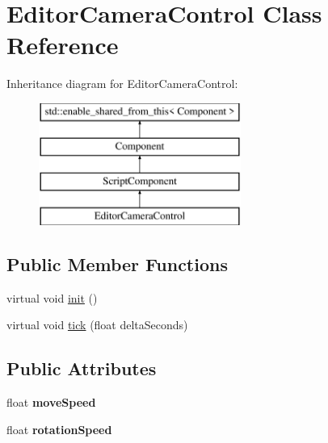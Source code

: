 \hypertarget{class_editor_camera_control}{}\section{Editor\+Camera\+Control Class Reference}
\label{class_editor_camera_control}
Inheritance diagram for Editor\+Camera\+Control\+:\begin{figure}[H]
\begin{center}
\leavevmode
\includegraphics[height=4.000000cm]{class_editor_camera_control}
\end{center}
\end{figure}
\subsection*{Public Member Functions}
\begin{DoxyCompactItemize}
\item 
virtual void \hyperlink{class_editor_camera_control_af672d52ea342e6762f9f104898959181}{init} ()
\item 
virtual void \hyperlink{class_editor_camera_control_a829966c94f5f99911a20534692dcc78f}{tick} (float delta\+Seconds)
\end{DoxyCompactItemize}
\subsection*{Public Attributes}
\begin{DoxyCompactItemize}
\item 
\hypertarget{class_editor_camera_control_a5297aa27db37eabd8ba5c6927e7635ab}{}float {\bfseries move\+Speed}\label{class_editor_camera_control_a5297aa27db37eabd8ba5c6927e7635ab}

\item 
\hypertarget{class_editor_camera_control_a2c9b2cd83d46061b6f7f2afc26e708b3}{}float {\bfseries rotation\+Speed}\label{class_editor_camera_control_a2c9b2cd83d46061b6f7f2afc26e708b3}

\end{DoxyCompactItemize}
